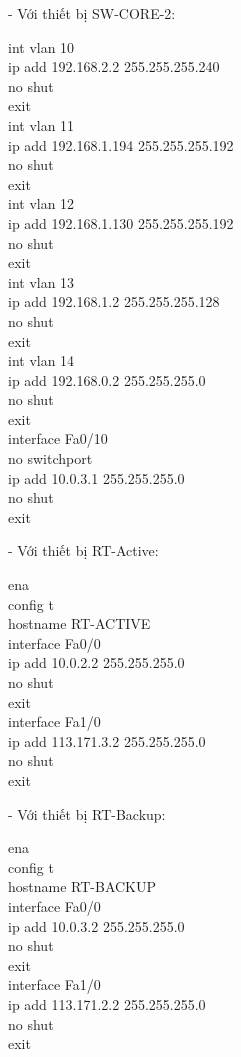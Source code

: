 \documentclass[12pt, a4paper]{article}
\begin{document}
\begin{flushleft}
		\newpage
		- Với thiết bị SW-CORE-2:
		\begin{tcolorbox}
			int vlan 10\\
			ip add 192.168.2.2 255.255.255.240\\
			no shut\\
			exit\\
			int vlan 11\\
			ip add 192.168.1.194 255.255.255.192\\
			no shut\\
			exit\\
			int vlan 12\\
			ip add 192.168.1.130 255.255.255.192\\
			no shut\\
			exit\\
			int vlan 13\\
			ip add 192.168.1.2 255.255.255.128\\
			no shut\\
			exit\\
			int vlan 14\\
			ip add 192.168.0.2 255.255.255.0\\
			no shut\\
			exit\\
			interface Fa0/10\\
			no switchport\\
			ip add 10.0.3.1 255.255.255.0\\
			no shut\\
			exit
		\end{tcolorbox}
	
		\newpage
		- Với thiết bị RT-Active:
		\begin{tcolorbox}
			ena\\
			config t\\
			hostname RT-ACTIVE\\
			interface Fa0/0\\
			ip add 10.0.2.2 255.255.255.0\\
			no shut\\
			exit\\
			interface Fa1/0\\
			ip add 113.171.3.2 255.255.255.0\\
			no shut\\
			exit
		\end{tcolorbox}
		\par
		- Với thiết bị RT-Backup:
		\begin{tcolorbox}
			ena\\
			config t\\
			hostname RT-BACKUP\\
			interface Fa0/0\\
			ip add 10.0.3.2 255.255.255.0\\
			no shut\\
			exit\\
			interface Fa1/0\\
			ip add 113.171.2.2 255.255.255.0\\
			no shut\\
			exit
		\end{tcolorbox}
	\end{flushleft}
	
\end{document}
